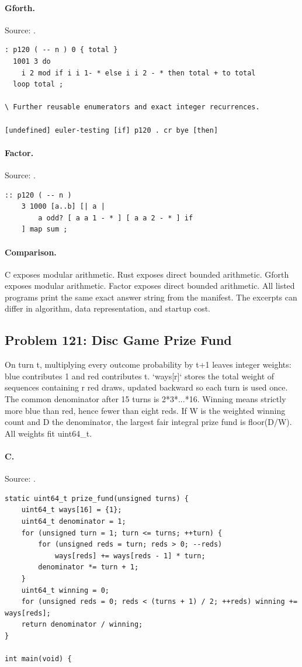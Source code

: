\paragraph{Gforth.} Source: .
\begin{lstlisting}
: p120 ( -- n ) 0 { total }
  1001 3 do
    i 2 mod if i i 1- * else i i 2 - * then total + to total
  loop total ;

\ Further reusable enumerators and exact integer recurrences.

[undefined] euler-testing [if] p120 . cr bye [then]
\end{lstlisting}

\paragraph{Factor.} Source: .
\begin{lstlisting}
:: p120 ( -- n )
    3 1000 [a..b] [| a |
        a odd? [ a a 1 - * ] [ a a 2 - * ] if
    ] map sum ;
\end{lstlisting}

\paragraph{Comparison.}
C exposes modular arithmetic. Rust exposes direct bounded arithmetic. Gforth exposes modular arithmetic. Factor exposes direct bounded arithmetic.
All listed programs print the same exact answer string from the manifest. The excerpts can differ in algorithm, data representation, and startup cost.

\subsection{Problem 121: Disc Game Prize Fund}
\label{walkthrough:p121}
On turn t, multiplying every outcome probability by t+1 leaves integer weights: blue contributes 1 and red contributes t. `ways[r]` stores the total weight of sequences containing r red draws, updated backward so each turn is used once. The common denominator after 15 turns is 2*3*...*16. Winning means strictly more blue than red, hence fewer than eight reds. If W is the weighted winning count and D the denominator, the largest fair integral prize fund is floor(D/W). All weights fit uint64\_t.

\paragraph{C.} Source: .
\begin{lstlisting}
static uint64_t prize_fund(unsigned turns) {
    uint64_t ways[16] = {1};
    uint64_t denominator = 1;
    for (unsigned turn = 1; turn <= turns; ++turn) {
        for (unsigned reds = turn; reds > 0; --reds)
            ways[reds] += ways[reds - 1] * turn;
        denominator *= turn + 1;
    }
    uint64_t winning = 0;
    for (unsigned reds = 0; reds < (turns + 1) / 2; ++reds) winning += ways[reds];
    return denominator / winning;
}

int main(void) {
\end{lstlisting}

